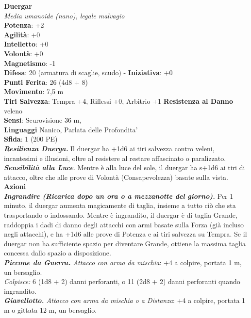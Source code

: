 \begin{multicols}{2}
\medskip\textbf{Duergar}\\
\emph{Media umanoide (nano), legale malvagio}\\
\textbf{Potenza}: +2\\
\textbf{Agilità}: +0\\
\textbf{Intelletto}: +0\\
\textbf{Volontà}: +0\\
\textbf{Magnetismo}: -1\\
\textbf{Difesa}: 20 (armatura di scaglie, scudo) - \textbf{Iniziativa}: +0\\
\textbf{Punti Ferita}: 26 (4d8 + 8)\\
\textbf{Movimento}: 7,5 m\\
\textbf{Tiri Salvezza}: Tempra +4, Riflessi +0, Arbitrio +1
\textbf{Resistenza al Danno} veleno\\
\textbf{Sensi}: Scurovisione 36 m, \\
\textbf{Linguaggi} Nanico, Parlata delle Profondita'\\
\textbf{Sfida}: 1 (200 PE)\smallskip\\
\emph{\textbf{Resilienza Duerga.}} Il duergar ha +1d6 ai tiri salvezza contro veleni, incantesimi e illusioni, oltre al resistere al restare affascinato o paralizzato.\\
\emph{\textbf{Sensibilità alla Luce}}. Mentre è alla luce del sole, il duergar ha s+1d6 ai tiri di attacco, oltre che alle prove di Volontà (Consapevolezza) basate sulla vista.\\
\smallskip\textbf{Azioni}\\
\emph{\textbf{Ingrandire (Ricarica dopo un ora o a mezzanotte del giorno).}} Per 1 minuto, il duergar aumenta magicamente di taglia, insieme a tutto ciò che sta trasportando o indossando. Mentre è ingrandito, il duergar è di taglia Grande, raddoppia i dadi di danno degli attacchi con armi basate sulla Forza (già incluso negli attacchi), e ha +1d6 alle prove di Potenza e ai tiri salvezza su Tempra. Se il duergar non ha sufficiente spazio per diventare Grande, ottiene la massima taglia concessa dallo spazio a disposizione.\\
\emph{\textbf{Piccone da Guerra.} Attacco con arma da mischia}: +4 a colpire, portata 1 m, un bersaglio.\\
\emph{Colpisce:} 6 (1d8 + 2) danni perforanti, o 11 (2d8 + 2) danni perforanti quando ingrandito.\\
\emph{\textbf{Giavellotto.} Attacco con arma da mischia o a Distanza}: +4 a colpire, portata 1 m o gittata 12 m, un bersaglio.\\

\end{multicols}
